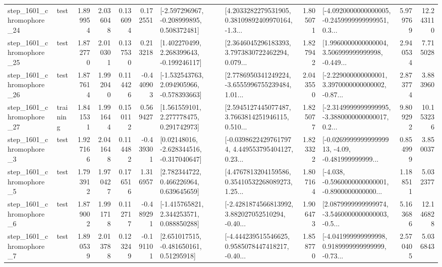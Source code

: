 \begin{tabular}{llrrrrllrlrr}
 step\_1601\_chromophore\_24 &      test &      1.899954 &    2.036048 &      0.136094 &  0.172551 &   [-2.597296967, -0.208999895, 0.508372481] &  [4.2033282279531905, 0.38109892409970164, -1.3... &       1.805071 &  [-4.0920000000000005, -0.2459999999999951, 0.3... &            5.979769 &         12.243110 \\
 step\_1601\_chromophore\_25 &      test &      1.872770 &    2.010301 &      0.137530 &  0.213218 &    [1.402270499, 2.268399643, -0.199246117] &  [2.3646045296183393, 3.7973830722462294, 0.079... &       1.827942 &  [1.9960000000000004, 3.506999999999998, -0.449... &            2.940534 &          7.715028 \\
 step\_1601\_chromophore\_26 &      test &      1.877614 &    1.992040 &      0.114426 & -0.440903 &   [-1.532543763, 2.094905966, -0.578393663] &  [2.7786950341249224, -3.6555996755239484, 1.01... &       2.043550 &  [-2.229000000000001, 3.3970000000000002, -0.87... &            2.873774 &          3.883960 \\
 step\_1601\_chromophore\_27 &  training &      1.841531 &    1.991644 &      0.150112 &  0.569427 &     [1.561559101, 2.277778475, 0.291742973] &  [2.5945127445077487, 3.7663814251946115, 0.510... &       1.825077 &  [-2.3149999999999995, -3.3880000000000017, 0.2... &            9.809292 &         10.153236 \\
  step\_1601\_chromophore\_3 &      test &      1.927166 &    2.041648 &      0.114482 & -0.439301 &    [0.02148016, -2.628344516, -0.317040647] &  [-0.03986224297617974, 4.449553795404127, 0.23... &       1.823322 &  [-0.026999999999999913, -4.09, -0.481999999999... &            0.854999 &          3.850037 \\
  step\_1601\_chromophore\_5 &      test &      1.793912 &    1.970427 &      0.176516 &  1.316957 &     [2.782344722, 0.466226964, 0.639645659] &  [4.4767813204159586, 0.35410532268089273, 1.25... &       1.807164 &  [-4.038, -0.5960000000000001, -0.8900000000000... &            1.188511 &          5.032377 \\
  step\_1601\_chromophore\_6 &      test &      1.879002 &    1.991718 &      0.112717 & -0.489291 &    [-1.415765821, 2.344253571, 0.088850288] &  [-2.4281874566813992, 3.882027052510294, -0.40... &       1.906473 &  [2.0879999999999974, -3.5460000000000003, -0.5... &            5.163686 &         12.146828 \\
  step\_1601\_chromophore\_7 &      test &      1.890539 &    2.013788 &      0.123249 & -0.191101 &     [2.651017515, -0.481650161, 0.51295918] &  [-4.444239515546625, 0.9585078447418217, -0.40... &       1.858770 &  [-4.041999999999998, 0.9189999999999999, -0.73... &            2.570405 &          5.036843 \\

\end{tabular}
